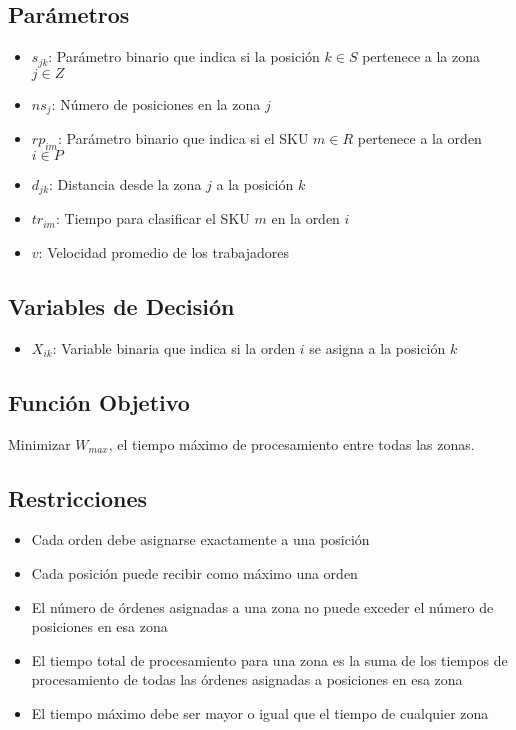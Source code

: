 \documentclass{hw-template}
\begin{document}
\subsection{Parámetros}
\begin{itemize}
    \item $s_{jk}$: Parámetro binario que indica si la posición $k \in S$ pertenece a la zona $j \in Z$
    \item $ns_j$: Número de posiciones en la zona $j$
    \item $rp_{im}$: Parámetro binario que indica si el SKU $m \in R$ pertenece a la orden $i \in P$
    \item $d_{jk}$: Distancia desde la zona $j$ a la posición $k$
    \item $tr_{im}$: Tiempo para clasificar el SKU $m$ en la orden $i$
    \item $v$: Velocidad promedio de los trabajadores
\end{itemize}

\subsection{Variables de Decisión}
\begin{itemize}
    \item $X_{ik}$: Variable binaria que indica si la orden $i$ se asigna a la posición $k$
\end{itemize}

\subsection{Función Objetivo}
Minimizar $W_{max}$, el tiempo máximo de procesamiento entre todas las zonas.

\subsection{Restricciones}
\begin{itemize}
    \item Cada orden debe asignarse exactamente a una posición
    \item Cada posición puede recibir como máximo una orden
    \item El número de órdenes asignadas a una zona no puede exceder el número de posiciones en esa zona
    \item El tiempo total de procesamiento para una zona es la suma de los tiempos de procesamiento de todas las órdenes asignadas a posiciones en esa zona
    \item El tiempo máximo debe ser mayor o igual que el tiempo de cualquier zona
\end{itemize}
\end{document}
